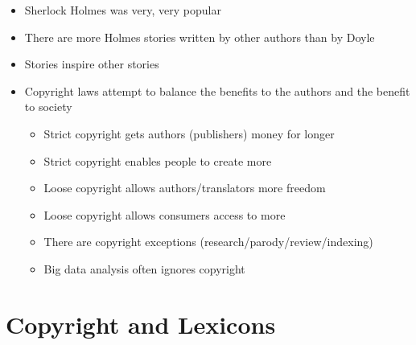 \documentclass[a4paper,landscape,headrule,footrule,xetex]{foils}
\begin{document}

\begin{itemize}
\item Sherlock Holmes was very, very popular
\item There are more Holmes stories written by other authors than by Doyle
\item Stories inspire other stories
\item Copyright laws attempt to balance the benefits to the authors
  and the benefit to society
  \begin{itemize}
  \item Strict copyright gets authors (publishers) money for longer
  \item Strict copyright enables people to create more
  \item Loose copyright allows authors/translators more freedom
  \item Loose copyright allows consumers access to more
  \item There are copyright exceptions (research/parody/review/indexing)
  \item Big data analysis often ignores copyright
  \end{itemize}
\end{itemize}


\section{Copyright and Lexicons}
\end{document}
